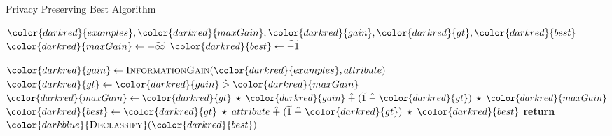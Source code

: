 \begin{algorithm}[H]
\caption{Privacy Preserving Best Algorithm}\label{a:id3-best-pp}
\begin{algorithmic}[1]
\Require ${\color{darkred}{examples}}, {\color{darkred}{maxGain}}, {\color{darkred}{gain}}, {\color{darkred}{gt}}, {\color{darkred}{best}}$
    \State ${\color{darkred}{maxGain}} \gets -\enc{\infty}$
    \State ${\color{darkred}{best}} \gets \enc{-1}$

        \State ${\color{darkred}{gain}} \gets  \textsc{InformationGain}({\color{darkred}{examples}}, attribute)$
        \State ${\color{darkred}{gt}} \gets {\color{darkred}{gain}} \hgt  {\color{darkred}{maxGain}}$
        \State ${\color{darkred}{maxGain}} \gets {\color{darkred}{gt}} \hmul {\color{darkred}{gain}} \hplus (\enc{1} \hminus {\color{darkred}{gt}}) \hmul {\color{darkred}{maxGain}}$ 
        \State ${\color{darkred}{best}} \gets {\color{darkred}{gt}} \hmul attribute \hplus (\enc{1} \hminus {\color{darkred}{gt}}) \hmul {\color{darkred}{best}}$
    \EndFor
    \State \textbf{return} ${\color{darkblue}{\textsc{Declassify}}}({\color{darkred}{best}})$
\EndProcedure
\end{algorithmic}
\end{algorithm}